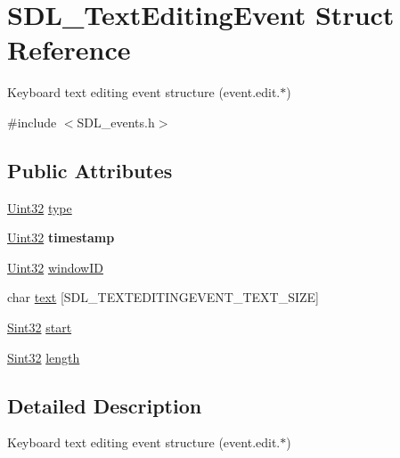 \hypertarget{struct_s_d_l___text_editing_event}{}\section{S\+D\+L\+\_\+\+Text\+Editing\+Event Struct Reference}
\label{struct_s_d_l___text_editing_event}


Keyboard text editing event structure (event.\+edit.$\ast$)  




{\ttfamily \#include $<$S\+D\+L\+\_\+events.\+h$>$}

\subsection*{Public Attributes}
\begin{DoxyCompactItemize}
\item 
\hyperlink{_s_d_l__stdinc_8h_add440eff171ea5f55cb00c4a9ab8672d}{Uint32} \hyperlink{struct_s_d_l___text_editing_event_a198e6df194a3bf12cf5f82553e84c7cb}{type}
\item 
\hypertarget{struct_s_d_l___text_editing_event_afc164f40abee6fd8e72e01b589210c75}{}\hyperlink{_s_d_l__stdinc_8h_add440eff171ea5f55cb00c4a9ab8672d}{Uint32} {\bfseries timestamp}\label{struct_s_d_l___text_editing_event_afc164f40abee6fd8e72e01b589210c75}

\item 
\hyperlink{_s_d_l__stdinc_8h_add440eff171ea5f55cb00c4a9ab8672d}{Uint32} \hyperlink{struct_s_d_l___text_editing_event_a23b3e414cf7a7ccc547b7595ca930049}{window\+I\+D}
\item 
char \hyperlink{struct_s_d_l___text_editing_event_a29848c2e7819ea98ae8fb08543e6d420}{text} \mbox{[}S\+D\+L\+\_\+\+T\+E\+X\+T\+E\+D\+I\+T\+I\+N\+G\+E\+V\+E\+N\+T\+\_\+\+T\+E\+X\+T\+\_\+\+S\+I\+Z\+E\mbox{]}
\item 
\hyperlink{_s_d_l__stdinc_8h_a7a90b941db9d4582e9ad7abb9940ff7e}{Sint32} \hyperlink{struct_s_d_l___text_editing_event_ac6c6a00835d92b12c0ba5b78b5ad676d}{start}
\item 
\hyperlink{_s_d_l__stdinc_8h_a7a90b941db9d4582e9ad7abb9940ff7e}{Sint32} \hyperlink{struct_s_d_l___text_editing_event_adca95505c0bf212834930df58f6d1aa5}{length}
\end{DoxyCompactItemize}


\subsection{Detailed Description}
Keyboard text editing event structure (event.\+edit.$\ast$) 

